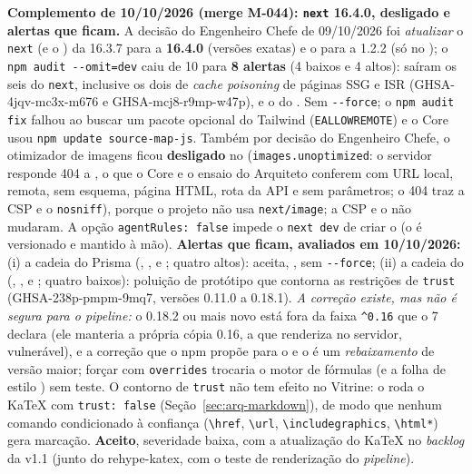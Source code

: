 \textbf{Complemento de 10/10/2026 (merge M-044): \texttt{next} 16.4.0,  desligado e alertas que ficam.} A decisão do Engenheiro Chefe de 09/10/2026 foi \emph{atualizar} o \texttt{next} (e o ) da 16.3.7 para a \textbf{16.4.0} (versões exatas) e o  para a 1.2.2 (só no ); o \texttt{npm audit -{}-omit=dev} caiu de 10 para \textbf{8 alertas} (4 baixos e 4 altos): saíram os seis do \texttt{next}, inclusive os dois de \emph{cache poisoning} de páginas SSG e ISR (GHSA-4jqv-mc3x-m676 e GHSA-mcj8-r9mp-w47p), e o do . Sem \texttt{-{}-force}; o \texttt{npm audit fix} falhou ao buscar um pacote opcional do Tailwind (\texttt{EALLOWREMOTE}) e o Core usou \texttt{npm update source-map-js}. Também por decisão do Engenheiro Chefe, o otimizador de imagens ficou \textbf{desligado} no  (\texttt{images.unoptimized}: o servidor responde 404 a , o que o Core e o ensaio do Arquiteto conferem com URL local, remota, sem esquema, página HTML, rota da API e sem parâmetros; o 404 traz a CSP e o \texttt{nosniff}), porque o projeto não usa \texttt{next/image}; a CSP e o  não mudaram. A opção \texttt{agentRules: false} impede o \texttt{next dev} de criar o  (o  é versionado e mantido à mão). \textbf{Alertas que ficam, avaliados em 10/10/2026:} (i) a cadeia do Prisma (, ,  e ; quatro altos): aceita, , sem \texttt{-{}-force}; (ii) a cadeia do  (, ,  e ; quatro baixos): poluição de protótipo que contorna as restrições de \texttt{trust} (GHSA-238p-pmpm-9mq7, versões 0.11.0 a 0.18.1). \emph{A correção existe, mas não é segura para o \emph{pipeline}:} o  0.18.2 ou mais novo está fora da faixa \texttt{\^{}0.16} que o  7 declara (ele manteria a própria cópia 0.16, a que renderiza no servidor, vulnerável), e a correção que o npm propõe para o  e o  é um \emph{rebaixamento} de versão maior; forçar com \texttt{overrides} trocaria o motor de fórmulas (e a folha de estilo ) sem teste. O contorno de \texttt{trust} não tem efeito no Vitrine: o  roda o KaTeX com \texttt{trust: false} (Seção~\ref{sec:arq-markdown}), de modo que nenhum comando condicionado à confiança (\verb|\href|, \verb|\url|, \verb|\includegraphics|, \verb|\html*|) gera marcação. \textbf{Aceito}, severidade baixa, com a atualização do KaTeX no \emph{backlog} da v1.1 (junto do rehype-katex, com o teste de renderização do \emph{pipeline}).
